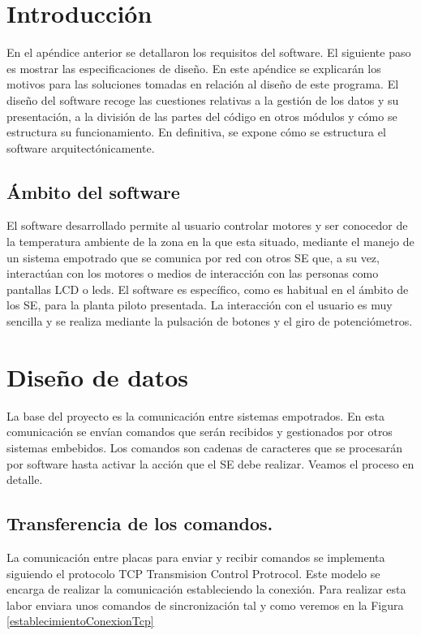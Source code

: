 \section{Introducción}
En el apéndice anterior se detallaron los requisitos del software. El siguiente paso es mostrar las especificaciones de diseño. En este apéndice se explicarán los motivos para las soluciones tomadas en relación al diseño de este programa. 
El diseño del software recoge las cuestiones relativas a la gestión de los datos y su presentación, a la división de las partes del código en otros módulos y cómo se estructura su funcionamiento. En definitiva, se expone cómo se estructura el software arquitectónicamente.

\subsection{Ámbito del software}
El software desarrollado permite al usuario controlar motores y ser conocedor de la temperatura ambiente de la zona en la que esta situado, mediante el manejo de un sistema empotrado que se comunica por red con otros SE que, a su vez, interactúan con los motores o medios de interacción con las personas como pantallas LCD o leds. El software es específico, como es habitual en el ámbito de los SE, para la planta piloto presentada. La interacción con el usuario es muy sencilla y se realiza mediante la pulsación de botones y el giro de potenciómetros.


\section{Diseño de datos}
La base del proyecto es la comunicación entre sistemas empotrados. En esta comunicación se envían comandos que serán recibidos y gestionados por otros sistemas embebidos. Los comandos son cadenas de caracteres que se procesarán por software hasta activar la acción que el SE debe realizar. Veamos el proceso en detalle.

\subsection{Transferencia de los comandos.}
La comunicación entre placas para enviar y recibir comandos se implementa siguiendo el protocolo TCP Transmision Control Protrocol. Este modelo se encarga de realizar la comunicación estableciendo la conexión. Para realizar esta labor enviara unos comandos de sincronización \cite{establecerConexionTCP} tal y como veremos en la Figura \ref{establecimientoConexionTcp}

